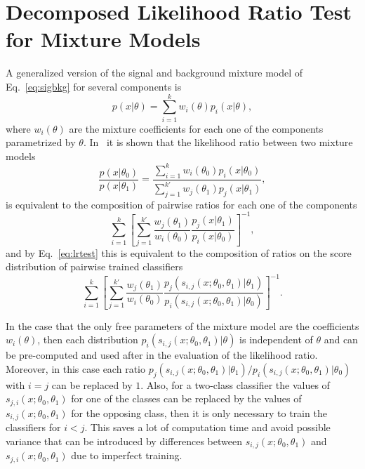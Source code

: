 \documentclass[11pt, oneside]{article}   	%
\begin{document}
\section{Decomposed Likelihood Ratio Test for Mixture Models}\label{S:DLR}
A generalized version of the signal and background mixture  model of Eq.~\ref{eq:sigbkg} for several components is 
\begin{equation}
p(x|\theta)=\sum_{i=1}^k w_i(\theta) p_i(x|\theta),  
\end{equation}
where $w_i(\theta)$ are the mixture coefficients for each one of the components parametrized by $\theta$. In~\citep{Cranmer2015} it is shown that the likelihood ratio between two mixture models
\begin{equation}
\frac{p(x|\theta_0)}{p(x|\theta_1)}= \frac{ \sum_{i=1}^k  w_i(\theta_0) p_i(x|\theta_0)}{\sum_{j=1}^{k'} w_{j}(\theta_1) p_{j}(x| \theta_1)}, 
\end{equation}
is equivalent to the composition of pairwise ratios for each one of the components
\begin{equation}
\sum_{i=1}^k \left[ \sum_{j=1}^{k'} \frac{ w_{j}(\theta_1)}{w_i(\theta_0)} \frac{ p_{j}(x|\theta_1)}{  p_i(x| \theta_0)}  \right]^{-1},
\end{equation}
and by Eq.~\ref{eq:lrtest} this is equivalent to the composition of ratios on the score distribution of pairwise trained classifiers
\begin{equation}
\sum_{i=1}^k \left[ \sum_{j=1}^{k'} \frac{ w_{j}(\theta_1)}{w_i(\theta_0)} \frac{ p_{j}(s_{i,j}(x;\theta_0, \theta_1)|\theta_1)}{  p_i(s_{i,j}(x;\theta_0, \theta_1)| \theta_0)}  \right]^{-1}.
\end{equation}

In the case that the only free parameters of the mixture model are the coefficients $w_i(\theta)$, then each distribution $p_i(s_{i,j}(x;\theta_0, \theta_1)|\theta)$ is independent of $\theta$ and can be pre-computed and used after in the evaluation of the likelihood ratio. Moreover, in this case each ratio $p_{j}(s_{i,j}(x;\theta_0, \theta_1)|\theta_1)/ p_i(s_{i,j}(x;\theta_0, \theta_1)| \theta_0)$ with $i=j$ can be replaced by $1$. Also, for a two-class classifier the values of $s_{j,i}(x;\theta_0,\theta_1)$ for one of the classes can be replaced by the values of $s_{i,j}(x;\theta_0,\theta_1)$ for the opposing class, then it is only necessary to train the classifiers for $i < j$. This saves a lot of computation time and avoid possible variance that can be introduced by differences between $s_{i,j}(x;\theta_0, \theta_1)$ and $s_{j,i}(x;\theta_0, \theta_1)$ due to imperfect training.
\end{document}
